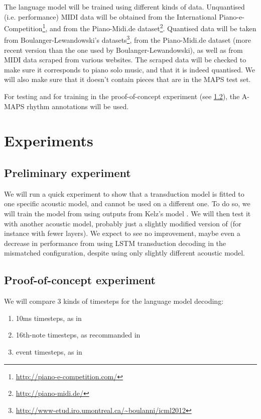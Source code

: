 \documentclass{article}
\begin{document}
The language model will be trained using different kinds of data.
Unquantised (i.e. performance) MIDI data will be obtained from the International Piano-e-Competition\footnote{\url{http://piano-e-competition.com/}},
and from the Piano-Midi.de dataset\footnote{\url{http://piano-midi.de/}}.
Quantised data will be taken from Boulanger-Lewandowski's datasets\footnote{\url{http://www-etud.iro.umontreal.ca/~boulanni/icml2012}},
from the Piano-Midi.de dataset (more recent version than the one used by Boulanger-Lewandowski),
as well as from MIDI data scraped from various websites.
The scraped data will be checked to make sure it corresponds to piano solo music, and that it is indeed quantised.
We will also make sure that it doesn't contain pieces that are in the MAPS test set.

For testing and for training in the proof-of-concept experiment (see \ref{sec:POC}), the A-MAPS \cite{ycart2018maps} rhythm annotations will be used.

\section{Experiments}

\subsection{Preliminary experiment}

We will run a quick experiment to show that a transduction model is fitted to one specific acoustic model, and cannot be used on a different one.
To do so, we will train the model from \cite{ycart2018polyphonic} using outputs from Kelz's model \cite{Kelz2016}.
We will then test it with another acoustic model, probably just a slightly modified version of  \cite{Kelz2016} (for instance with fewer layers).
We expect to see no improvement, maybe even a decrease in performance from using LSTM transduction decoding in the mismatched configuration, despite using only slightly different acoustic model.

\subsection{Proof-of-concept experiment}
\label{sec:POC}

We will compare 3 kinds of timesteps for the language model decoding:

\begin{enumerate}
\item 10ms timesteps, as in \cite{sigtia2016end}
\item 16th-note timesteps, as recommanded in \cite{Ycart2017}
\item event timesteps, as in \cite{app8030470}
\end{enumerate}
\end{document}
